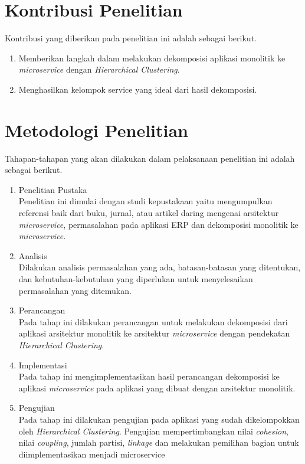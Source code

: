 \section{Kontribusi Penelitian}
Kontribusi yang diberikan pada penelitian ini adalah sebagai berikut.
\begin{enumerate}[nolistsep,leftmargin=0.5cm]
  \item Memberikan langkah dalam melakukan dekomposisi aplikasi monolitik ke \textit{microservice} dengan \textit{Hierarchical Clustering}.
  \item Menghasilkan kelompok service yang ideal dari hasil dekomposisi.\\
\end{enumerate}

\section{Metodologi Penelitian}
Tahapan-tahapan yang akan dilakukan dalam pelaksanaan penelitian ini adalah sebagai berikut.
\begin{enumerate}[nolistsep,leftmargin=0.5cm]
  \item Penelitian Pustaka \\
  Penelitian ini dimulai dengan studi kepustakaan yaitu mengumpulkan referensi baik dari buku, jurnal, atau artikel daring mengenai arsitektur \textit{microservice}, permasalahan pada aplikasi ERP dan dekomposisi monolitik ke \textit{microservice}.
  \item Analisis \\
  Dilakukan analisis permasalahan yang ada, batasan-batasan yang ditentukan, dan  kebutuhan-kebutuhan yang diperlukan untuk menyelesaikan permasalahan yang ditemukan.
  \item Perancangan \\
  Pada tahap ini dilakukan perancangan untuk melakukan dekomposisi dari aplikasi arsitektur monolitik ke arsitektur \textit{microservice} dengan pendekatan \textit{Hierarchical Clustering}.
  \item Implementasi \\
  Pada tahap ini mengimplementasikan hasil perancangan dekomposisi ke aplikasi \textit{microservice} pada aplikasi yang dibuat dengan arsitektur monolitik.
  \item Pengujian \\
  Pada tahap ini  dilakukan pengujian pada aplikasi yang sudah dikelompokkan oleh \textit{Hierarchical Clustering}. Pengujian mempertimbangkan nilai \textit{cohesion}, nilai \textit{coupling}, jumlah partisi, \textit{linkage} dan melakukan pemilihan bagian untuk diimplementasikan menjadi microservice  \\ 
\end{enumerate}

